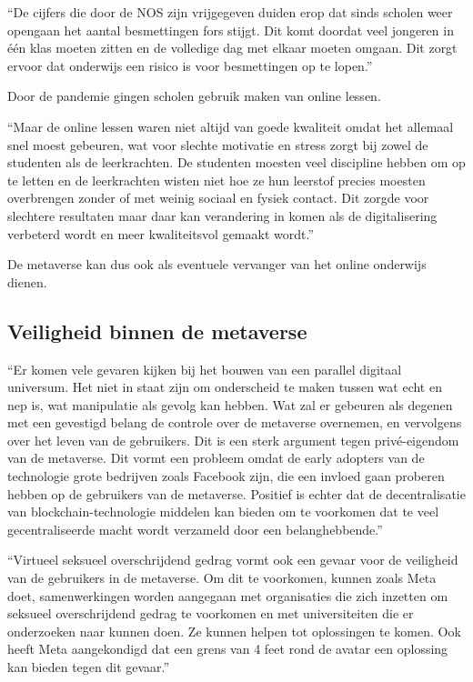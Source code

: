 \documentclass{hogent-article}
\begin{document}
``De cijfers die door de NOS zijn vrijgegeven duiden erop dat sinds scholen weer opengaan het aantal besmettingen fors stijgt. Dit komt doordat veel jongeren in één klas moeten zitten en de volledige dag met elkaar moeten omgaan. Dit zorgt ervoor dat onderwijs een risico is voor besmettingen op te lopen.'' \autocite{NIEUWS2021}

Door de pandemie gingen scholen gebruik maken van online lessen.  

``Maar de online lessen waren niet altijd van goede kwaliteit omdat het allemaal snel moest gebeuren, wat voor slechte motivatie en stress zorgt bij zowel de studenten als de leerkrachten. De studenten moesten veel discipline hebben om op te letten en de leerkrachten wisten niet hoe ze hun leerstof precies moesten overbrengen zonder of met weinig sociaal en fysiek contact. Dit zorgde voor slechtere resultaten maar daar kan verandering in komen als de digitalisering verbeterd wordt en meer kwaliteitsvol gemaakt wordt.'' \autocite{Jeugdinstituut2022}

De metaverse kan dus ook als eventuele vervanger van het online onderwijs dienen.

\subsection{Veiligheid binnen de metaverse}
``Er komen vele gevaren kijken bij het bouwen van een parallel digitaal universum. Het niet in staat zijn om onderscheid te maken tussen wat echt en nep is, wat manipulatie als gevolg kan hebben. Wat zal er gebeuren als degenen met een gevestigd belang de controle over de metaverse overnemen, en vervolgens over het leven van de gebruikers. Dit is een sterk argument tegen privé-eigendom van de metaverse. Dit vormt een probleem omdat de early adopters van de technologie grote bedrijven zoals Facebook zijn, die een invloed gaan proberen hebben op de gebruikers van de metaverse. Positief is echter dat de decentralisatie van blockchain-technologie middelen kan bieden om te voorkomen dat te veel gecentraliseerde macht wordt verzameld door een belanghebbende.'' \autocite{Phemex}

``Virtueel seksueel overschrijdend gedrag vormt ook een gevaar voor de veiligheid van de gebruikers in de metaverse. Om dit te voorkomen, kunnen zoals Meta doet, samenwerkingen worden aangegaan met organisaties die zich inzetten om seksueel overschrijdend gedrag te voorkomen en met universiteiten die er onderzoeken naar kunnen doen. Ze kunnen helpen tot oplossingen te komen. Ook heeft Meta aangekondigd dat een grens van 4 feet rond de avatar een oplossing kan bieden tegen dit gevaar.'' \autocite{CHATTERJEE2022}
\end{document}
